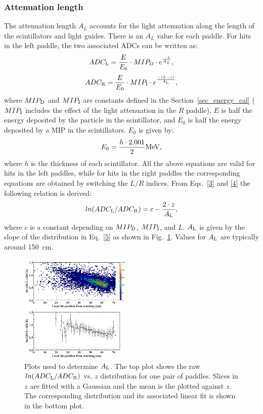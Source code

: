 \subsubsection{Attenuation length }
The attenuation length $A_{L}$ accounts for the light attenuation along the length of the scintillators and light guides. There is an $A_{L}$ value for each paddle.
For hits in the left paddle, the two associated ADCs can be written as:
\begin{equation}
\label{3}
ADC_{\rm{L}}=\frac{E}{E_0}\cdot MIP_{\rm{D}}\cdot e^{\frac{-z}{A_{L}}},
\end{equation}
\begin{equation}
\label{4}
ADC_{\rm{R}}=\frac{E}{E_0}\cdot MIP_{\rm{I}}\cdot e^{\frac{-(L-z)}{A_{\rm{L}}}},
\end{equation}
where $MIP_{\rm{D}}$ and $MIP_{\rm{I}}$ are constants defined in the Section~\ref{sec_energy_cal} ($MIP_{\rm{I}}$ includes the effect of the light attenuation in the $R$ paddle), $E$ is half the energy deposited by the particle in the scintillator, and $E_0$ is half the energy deposited by a MIP in the scintillators.
$E_0$ is given by:
\begin{equation}\label{eq_def_e0}
E_0=\frac{h\cdot 2.001}{2} \rm{MeV},
\end{equation}
where $h$ is the thickness of each scintillator.
All the above equations are valid for hits in the left paddles, while for hits in the right paddles the corresponding equations are obtained by switching the $L/R$ indices.
From Eqs.~\ref{3} and \ref{4} the following relation is derived:
\begin{equation}
\label{5}
ln(ADC_{\rm{L}}/ADC_{\rm{R}})=c-\frac{2\cdot z}{A_{\rm{L}}},
\end{equation}
where $c$ is a constant depending on $MIP_{\rm{D}}$, $MIP_{\rm{I}}$, and $L$. $A_{\rm{L}}$ is given by the slope of the distribution in Eq.~\ref{5} as shown in Fig.~\ref{attl}. Values for $A_{\rm{L}}$ are typically around 150~cm.

\begin{figure}[htb]
\begin{center}
\includegraphics[width=0.48\textwidth]{Figure/attl1.png} 
\end{center}
\caption{Plots used to determine $A_{\rm{L}}$. The top plot shows the raw $ln(ADC_{\rm{L}}/ADC_{\rm{R}})$ vs. $z$ distribution for one pair of paddles. Slices in $z$ are fitted with a Gaussian and the mean is the plotted against $z$. The corresponding distribution and its associated linear fit is shown in the bottom plot.}
\label{attl}
\end{figure}

